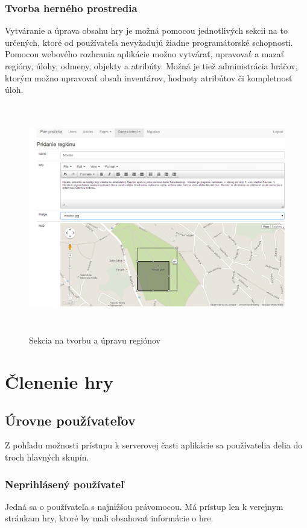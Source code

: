 \subsubsection{Tvorba herného prostredia}
Vytváranie a úprava obsahu hry je možná pomocou jednotlivých sekcii na to určených, ktoré od používateľa nevyžadujú žiadne programátorské schopnosti. Pomocou webového rozhrania aplikácie možno vytvárať, upravovať a mazať regióny, úlohy, odmeny, objekty a atribúty. Možná je tiež administrácia hráčov, ktorým možno upravovať obsah inventárov, hodnoty atribútov či kompletnosť úloh.
\begin{figure}[h]
  \centering
  \includegraphics[height=10cm]{mainmatter/imgs/server_pridanieregionu.png}
  \caption{Sekcia na tvorbu a úpravu regiónov}
  \label{fig:server_tvorbaRegionu}
\end{figure}

\section{Členenie hry}
\subsection{Úrovne používateľov}
Z pohľadu možnosti prístupu k serverovej časti aplikácie sa používatelia delia do troch hlavných skupín. 

\subsubsection{Neprihlásený používateľ}
Jedná sa o používateľa s najnižšou právomocou. Má prístup len k verejnym stránkam hry, ktoré by mali obsahovať informácie o hre.

